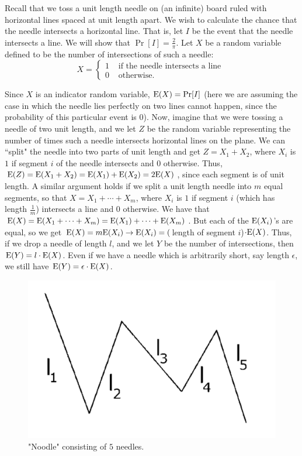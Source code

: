 \documentclass[11pt]{article}
\def\Ex#1{{\rm E}(#1)}
\begin{document}
Recall that we toss a unit length needle on (an infinite) board ruled with horizontal
lines spaced at unit length apart.  We wish to calculate
the chance that the needle intersects a horizontal line.  That is, let $I$ be the event that
the needle intersects a line.  We will show that $\Pr[I] = \frac{2}{\pi}$.  Let
$X$ be a random variable defined to be the number of intersections of such a needle:
$$X = \left\{ \begin{array}{cc}
1&\mbox{ if the needle intersects a line }\\
0&\mbox{ otherwise. }
\end{array}\right.$$

Since $X$ is an indicator random variable,  $\Ex{X} = \Pr[I] $
(here we are assuming the case in which the needle lies perfectly on two lines cannot happen, since
the probability of this particular event is $0$).
Now, imagine that we were tossing a needle of two unit length, and we let $Z$ be the random
variable representing the number of times such a needle intersects horizontal lines on the plane.
We can ``split" the needle into two parts of unit length and get $Z = X_1 + X_2$, where $X_i$
is $1$ if segment $i$ of the needle intersects and $0$ otherwise.  Thus, $\Ex{Z} = \Ex{X_1 + X_2}
= \Ex{X_1} + \Ex{X_2} = 2\Ex{X}$, since each segment is of unit length.  A similar argument holds
if we split a unit length needle into $m$ equal segments, so that $X = X_1 + \cdots + X_m$, where $X_i$
is $1$ if segment $i$ (which has length $\frac{1}{m}$) intersects a line and $0$ otherwise.  We have
that $\Ex{X} = \Ex{X_1 + \cdots + X_m} = \Ex{X_1} + \cdots + \Ex{X_m}$.  But each of the $\Ex{X_i}$'s are
equal, so we get $\Ex{X} = m\Ex{X_i} \rightarrow \Ex{X_i} = ($length of segment $i$)$\cdot \Ex{X}$.
Thus, if we drop a needle of length $l$, and we let $Y$ be the number of intersections, then
$\Ex{Y} = l \cdot \Ex{X}$.  Even if we have a needle which is arbitrarily short, say length $\epsilon$, we
still have $\Ex{Y} = \epsilon \cdot \Ex{X}$.  

\begin{figure}[h]
\begin{center}
\includegraphics[scale=0.4]{noodle.pdf}
\end{center}
\caption{"Noodle" consisting of $5$ needles.}
\label{fig:noodle}
\end{figure}
\end{document}
